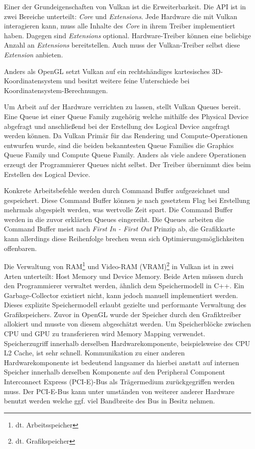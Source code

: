\documentclass[11pt]{scrartcl}
\begin{document}
	Einer der Grundeigenschaften von Vulkan ist die Erweiterbarkeit. Die API ist in zwei Bereiche unterteilt: \textit{Core} und \textit{Extensions}. Jede Hardware die mit Vulkan interagieren kann, muss alle Inhalte des \textit{Core} in ihrem Treiber implementiert haben. Dagegen sind \textit{Extensions} optional. Hardware-Treiber können eine beliebige Anzahl an \textit{Extensions} bereitstellen. Auch muss der Vulkan-Treiber selbst diese \textit{Extension} anbieten.\cite{Sellers2017, VulkanExtensions}
	
	Anders als OpenGL setzt Vulkan auf ein rechtshändiges kartesisches 3D-Koordinatensystem und besitzt weitere feine Unterschiede bei Koordinatensystem-Berechnungen.\cite{Harmer2023}
	
	Um Arbeit auf der Hardware verrichten zu lassen, stellt Vulkan Queues bereit. Eine Queue ist einer Queue Family zugehörig welche mithilfe des Physical Device abgefragt und anschließend bei der Erstellung des Logical Device angefragt werden können. Da Vulkan Primär für das Rendering und Compute-Operationen entwurfen wurde, sind die beiden bekanntesten Queue Families die Graphics Queue Family und Compute Queue Family\cite{VulkanQueues}. Anders als viele andere Operationen erzeugt der Programmierer Queues nicht selbst. Der Treiber übernimmt dies beim Erstellen des Logical Device\cite{Sellers2017}.
	
	Konkrete Arbeitsbefehle werden durch Command Buffer aufgezeichnet und gespeichert. Diese Command Buffer können je nach gesetztem Flag bei Erstellung mehrmals abgespielt werden, was wertvolle Zeit spart. Die Command Buffer werden in die zuvor erklärten Queues eingereiht. Die Queues arbeiten die Command Buffer meist nach \textit{First In - First Out} Prinzip ab, die Grafikkarte kann allerdings diese Reihenfolge brechen wenn sich Optimierungsmöglichkeiten offenbaren\cite{VulkanQueues}.\cite{Sellers2017}
	
	Die Verwaltung von RAM\footnote{dt. Arbeitsspeicher} und Video-RAM (VRAM)\footnote{dt. Grafikspeicher} in Vulkan ist in zwei Arten unterteilt: Host Memory und Device Memory\cite{Sellers2017}. Beide Arten müssen durch den Programmierer verwaltet werden, ähnlich dem Speichermodell in C++. Ein Garbage-Collector existiert nicht, kann jedoch manuell implementiert werden. Dieses explizite Speichermodell erlaubt gezielte und performante Verwaltung des Grafikspeichers. Zuvor in OpenGL wurde der Speicher durch den Grafiktreiber allokiert und musste von diesem abgeschätzt werden. Um Speicherblöcke zwischen CPU und GPU zu transferieren wird Memory Mapping verwendet. Speicherzugriff innerhalb derselben Hardwarekomponente, beispielsweise des CPU L2 Cache, ist sehr schnell. Kommunikation zu einer anderen Hardwarekomponente ist bedeutend langsamer da hierbei anstatt auf internen Speicher innerhalb derselben Komponente auf den Peripheral Component Interconnect Express (PCI-E)-Bus als Trägermedium zurückgegriffen werden muss. Der PCI-E-Bus kann unter umständen von weiterer anderer Hardware benutzt werden welche ggf. viel Bandbreite des Bus in Besitz nehmen.\cite{VulkanMemory}
	
\end{document}
